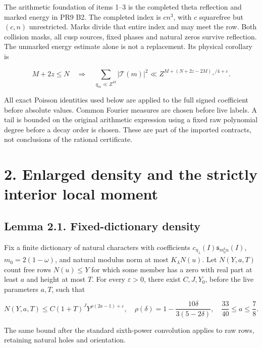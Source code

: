 \documentclass[11pt,a4paper]{article}
\begin{document}
The arithmetic foundation of items 1--3 is the completed theta
reflection and marked energy in PR9 B2. The completed index is \(cn^3\),
with \(c\) squarefree but \((c,n)\) unrestricted. Marks divide that
entire index and may meet the row. Both collision masks, all cusp
sources, fixed phases and natural zeros survive reflection. The unmarked
energy estimate alone is not a replacement. Its physical corollary is

\[
M+2z\le N\quad\Longrightarrow\quad
\sum_{q_m\ll Z^M}|\mathcal T(m)|^2
\ll Z^{M+(N+2z-2M)_+/4+\varepsilon}.
\tag{1.10}
\]

All exact Poisson identities used below are applied to the full signed
coefficient before absolute values. Common Fourier measures are chosen
before live labels. A tail is bounded on the original arithmetic
expression using a fixed raw polynomial degree before a decay order is
chosen. These are part of the imported contracts, not conclusions of the
rational certificate.

\hypertarget{enlarged-density-and-the-strictly-interior-local-moment}{%
\section{2. Enlarged density and the strictly interior local
moment}\label{enlarged-density-and-the-strictly-interior-local-moment}}

\hypertarget{lemma-2.1.-fixed-dictionary-density}{%
\subsection{Lemma 2.1. Fixed-dictionary
density}\label{lemma-2.1.-fixed-dictionary-density}}

Fix a finite dictionary of natural characters with coefficients
\(c_{\eta_\lambda}(I)\mathfrak s_{m_0^6u}(I)\), \(m_0=2(1-\omega)\), and
natural modulus norm at most \(K_\lambda N(u)\). Let \(N(Y,a,T)\) count
free rows \(N(u)\le Y\) for which some member has a zero with real part
at least \(a\) and height at most \(T\). For every \(\varepsilon>0\),
there exist \(C,J,Y_0\), before the live parameters \(a,T\), such that

\[
N(Y,a,T)\le C(1+T)^JY^{\rho(2a-1)+\varepsilon},
\quad \rho(\delta)=1-\frac{10\delta}{3(5-2\delta)},
\quad \frac{33}{40}\le a\le\frac78.
\tag{2.1}
\]

The same bound after the standard sixth-power convolution applies to raw
rows, retaining natural holes and orientation.
\end{document}
